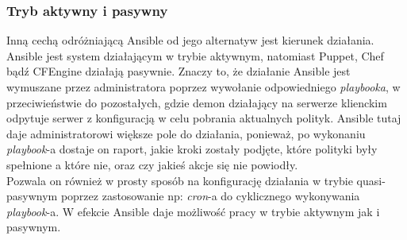 \subsubsection{Tryb aktywny i pasywny}
Inną cechą odróżniającą Ansible od jego alternatyw jest kierunek działania.
Ansible jest system działającym w trybie aktywnym, natomiast Puppet, Chef bądź CFEngine działają pasywnie.
Znaczy to, że działanie Ansible jest wymuszane przez administratora poprzez wywołanie odpowiedniego \textit{playbooka}, w przeciwieństwie do pozostałych, gdzie demon działający na serwerze klienckim odpytuje serwer z konfiguracją w celu pobrania aktualnych polityk.
Ansible tutaj daje administratorowi większe pole do działania, ponieważ, po wykonaniu \textit{playbook}-a dostaje on raport, jakie kroki zostały podjęte, które polityki były spełnione a które nie, oraz czy jakieś akcje się nie powiodły.\\
Pozwala on również w prosty sposób na konfigurację działania w trybie quasi-pasywnym poprzez zastosowanie np: \textit{cron}-a do cyklicznego wykonywania \textit{playbook}-a.
W efekcie Ansible daje możliwość pracy w trybie aktywnym jak i pasywnym.
